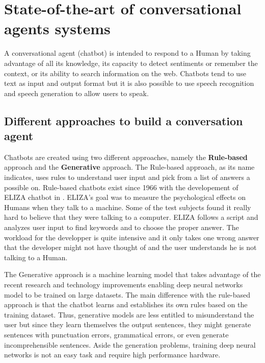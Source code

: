 
\chapter{State-of-the-art of conversational agents systems} %

\label{Chapter2} %

A conversational agent (chatbot) is intended to respond to a Human by taking advantage of all its knowledge, its capacity to detect sentiments or remember the context, or its ability to search information on the web. Chatbots tend to use text as input and output format but it is also possible to use speech recognition and speech generation to allow users to speak.

\section{Different approaches to build a conversation agent}
Chatbots are created using two different approaches, namely the \textbf{Rule-based} approach and the \textbf{Generative} approach. The Rule-based approach, as its name indicates, uses rules to understand user input and pick from a list of answers a possible on. Rule-based chatbots exist since 1966 with the developement of ELIZA chatbot in \citet{Weizenbaum:1966:ECP:365153.365168}. ELIZA's goal was to measure the psychological effects on Humans when they talk to a machine. Some of the test subjects found it really hard to believe that they were talking to a computer. ELIZA follows a script and analyzes user input to find keywords and to choose the proper answer. The workload for the developper is quite intensive and it only takes one wrong answer that the developer might not have thought of and the user understands he is not talking to a Human.

The Generative approach is a machine learning model that takes advantage of the recent research and technology improvements enabling deep neural networks model to be trained on large datasets. The main difference with the rule-based approach is that the chatbot learns and establishes its own rules based on the training dataset. Thus, generative models are less entitled to misunderstand the user but since they learn themselves the output sentences, they might generate sentences with punctuation errors, grammatical errors, or even generate incomprehensible sentences. Aside the generation problems, training deep neural networks is not an easy task and require high performance hardware.

